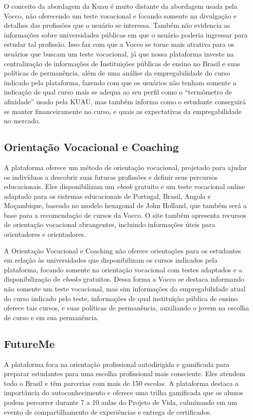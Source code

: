 O conceito da abordagem da Kuau é muito distante da abordagem usada pela Vocco, não oferecendo um teste vocacional  e focando somente na divulgação e detalhes das profissões que o usuário se interessa. Também não evidencia as informações sobre universidades públicas em que o usuário poderia ingressar para estudar tal profissão. Isso faz com que a Vocco se torne mais atrativa para os usuários que buscam um teste vocacional, já que nossa plataforma investe na centralização de informações de Instituições públicas de ensino no Brasil e suas políticas de permanência, além de uma análise da empregabilidade do curso indicado pela plataforma, fazendo com que os usuários não tenham somente a indicação de qual curso mais se adequa ao seu perfil como o “termômetro de afinidade” usado pela KUAU, mas também informa como o estudante conseguirá se manter financeiramente no curso, e quais as expectativas da empregabilidade no mercado.

\subsection{Orientação Vocacional e Coaching}
A plataforma oferece um método de orientação vocacional, projetado para ajudar os indivíduos a descobrir suas futuras profissões e definir seus percursos educacionais. Eles disponibilizam um \textit{ebook} gratuito e um teste vocacional online adaptado para os sistemas educacionais de Portugal, Brasil, Angola e Moçambique, baseado no modelo hexagonal de John Holland, que também será a base para a recomendação de cursos da Vocco. O site também apresenta recursos de orientação vocacional abrangentes, incluindo informações úteis para orientadores e orientadores.

A Orientação Vocacional e Coaching não oferece orientações para os estudantes em relação às universidades que disponibilizam os cursos indicados pela plataforma, focando somente na orientação vocacional com testes adaptados e a disponibilização de \textit{ebooks} gratuitos. Dessa forma a Vocco se destaca informando não somente um teste vocacional, mas sim informações da empregabilidade atual do curso indicado pelo teste, informações de qual instituição pública de ensino oferece tais cursos, e suas políticas de permanência, auxiliando o jovem na escolha de curso e em sua permanência.



\subsection{FutureMe}
A plataforma foca na orientação profissional autodirigida e gamificada para preparar estudantes para uma escolha profissional mais consciente. Eles atendem todo o Brasil e têm parcerias com mais de 150 escolas. A plataforma destaca a importância do autoconhecimento e oferece uma trilha gamificada que os alunos podem percorrer durante 7 a 10 aulas do Projeto de Vida, culminando em um evento de compartilhamento de experiências e entrega de certificados.

